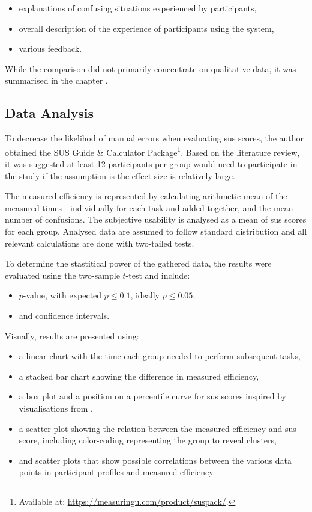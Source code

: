\begin{itemize}
    \item explanations of confusing situations experienced by participants,
    \item overall description of the experience of participants using the system,
    \item various feedback.
\end{itemize}

While the comparison did not primarily concentrate on qualitative data, it was summarised in the chapter .

\subsection{Data Analysis}

To decrease the likelihod of manual errors when evaluating \gls{sus} scores, the author obtained the SUS Guide \& Calculator Package\footnote{Available at: \url{https://measuringu.com/product/suspack/}.}.
Based on the  literature review, it was suggested at least 12 participants per group would need to participate in the study if the assumption is the effect size is relatively large.

The measured efficiency is represented by calculating arithmetic mean of the measured times - individually for each task and added together, and the mean number of confusions.
The subjective usability is analysed as a mean of \gls{sus} scores for each group.
Analysed data are assumed to follow standard distribution and all relevant calculations are done with two-tailed tests.

To determine the stastitical power of the gathered data, the results were evaluated using the two-sample $t$-test and include:

\begin{itemize}
    \item $p$-value, with expected $p \leq 0.1 $, ideally $p \leq 0.05 $,
    \item and confidence intervals.
\end{itemize}

Visually, results are presented using:

\begin{itemize}
    \item a linear chart with the time each group needed to perform subsequent tasks,
    \item a stacked bar chart showing the difference in measured efficiency,
    \item a box plot and a position on a percentile curve for \gls{sus} scores inspired by visualisations from \textcite{Blattgerste_2022},
    \item a scatter plot showing the relation between the measured efficiency and \gls{sus} score, including color-coding representing the group to reveal clusters,
    \item and scatter plots that show possible correlations between the various data points in participant profiles and measured efficiency.
\end{itemize}

